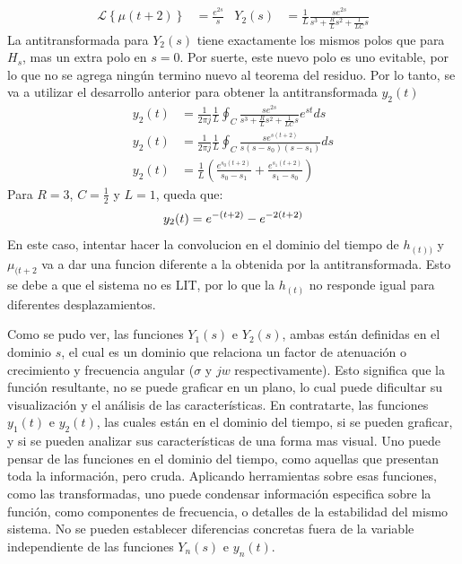 \documentclass[12pt,a4paper]{report}
\begin{document}
\begin{enumerate}[label=\alph*)]
\begin{align*}
        \mathcal{L} \left\{\mu (t+2)\right\} &= \frac{e^{2s}}{s} &Y_2(s)
          &= \frac{1}{L} \frac{se^{2s}}{s^3 + \frac{R}{L} s^2 + \frac{1}{LC}s}
      \end{align*}
      La antitransformada para $Y_2(s)$ tiene exactamente los mismos polos que para $H_s$, mas un extra polo en $s = 0$.
      Por suerte, este nuevo polo es uno evitable, por lo que no se agrega ningún termino nuevo al teorema del residuo.
      Por lo tanto, se va a utilizar el desarrollo anterior para obtener la antitransformada $y_2(t)$
      \begin{align*}
        y_2(t) &= \frac{1}{2\pi j} \frac{1}{L} \oint_C \frac{se^{2s}}{s^3 + \frac{R}{L} s^2 + \frac{1}{LC}s} e^{st} ds\\[6pt]
        y_2(t) &= \frac{1}{2\pi j} \frac{1}{L} \oint_C \frac{se^{s(t+2)}}{s(s-s_0)(s-s_1)} ds\\[6pt]
        y_2(t) &= \frac{1}{L} \left(\frac{e^{s_0(t+2)}}{s_0 - s_1} + \frac{e^{s_1(t+2)}}{s_1 - s_0}\right)
      \end{align*}
      Para $R = 3$, $C = \frac{1}{2}$ y $L = 1$, queda que:
      \begin{equation*}
        y_2(t) = e^{-(t+2)} - e^{-2(t+2)}\\[6pt]
      \end{equation*}
      En este caso, intentar hacer la convolucion en el dominio del tiempo de $h_{(t))}$ y $\mu_{(t+2}$ va a dar una
      funcion diferente a la obtenida por la antitransformada. Esto se debe a que el sistema no es LIT, por lo que la
      $h_{(t)}$ no responde igual para diferentes desplazamientos.

      Como se pudo ver, las funciones $Y_1(s)$ e $Y_2(s)$, ambas están definidas en el dominio $s$, el cual es un dominio
      que relaciona un factor de atenuación o crecimiento y frecuencia angular ($\sigma$ y $jw$ respectivamente). Esto
      significa que la función resultante, no se puede graficar en un plano, lo cual puede dificultar su visualización y
      el análisis de las características. En contratarte, las funciones $y_1(t)$ e $y_2(t)$, las cuales están en el
      dominio del tiempo, si se pueden graficar, y si se pueden analizar sus características de una forma mas visual. Uno
      puede pensar de las funciones en el dominio del tiempo, como aquellas que presentan toda la información, pero cruda.
      Aplicando herramientas sobre esas funciones, como las transformadas, uno puede condensar información especifica
      sobre la función, como componentes de frecuencia, o detalles de la estabilidad del mismo sistema. No se pueden
      establecer diferencias concretas fuera de la variable independiente de las funciones $Y_n(s)$ e $y_n(t)$.


\end{enumerate}
\end{document}
